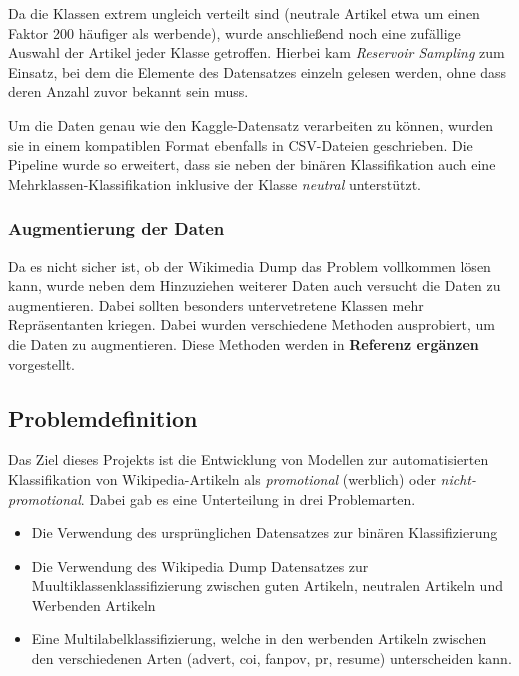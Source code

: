 Da die Klassen extrem ungleich verteilt sind (neutrale Artikel etwa um einen Faktor 200 häufiger als werbende), wurde anschließend noch eine zufällige Auswahl der Artikel jeder Klasse getroffen. Hierbei kam \textit{Reservoir Sampling} \cite{Vitter1985} zum Einsatz, bei dem die Elemente des Datensatzes einzeln gelesen werden, ohne dass deren Anzahl zuvor bekannt sein muss.

Um die Daten genau wie den Kaggle-Datensatz verarbeiten zu können, wurden sie in einem kompatiblen Format ebenfalls in CSV-Dateien geschrieben. Die Pipeline wurde so erweitert, dass sie neben der binären Klassifikation auch eine Mehrklassen-Klassifikation inklusive der Klasse \emph{neutral} unterstützt.

\subsubsection{Augmentierung der Daten}
\label{dataAugmentation}
Da es nicht sicher ist, ob der Wikimedia Dump das Problem vollkommen lösen kann, wurde neben dem Hinzuziehen weiterer Daten auch versucht die Daten zu augmentieren. Dabei sollten besonders untervetretene Klassen mehr Repräsentanten kriegen. Dabei wurden verschiedene Methoden ausprobiert, um die Daten zu augmentieren. Diese Methoden werden in \textbf{Referenz ergänzen} vorgestellt.

\subsection{Problemdefinition}
\label{Problemdefinition}
Das Ziel dieses Projekts ist die Entwicklung von Modellen zur automatisierten Klassifikation von Wikipedia-Artikeln als \emph{promotional} (werblich) oder \emph{nicht-promotional}. Dabei gab es eine Unterteilung in drei Problemarten.
\begin{itemize}
    \item Die Verwendung des ursprünglichen Datensatzes zur binären Klassifizierung
    \item Die Verwendung des Wikipedia Dump Datensatzes zur Muultiklassenklassifizierung zwischen guten Artikeln, neutralen Artikeln und Werbenden Artikeln
    \item Eine Multilabelklassifizierung, welche in den werbenden Artikeln zwischen den verschiedenen Arten (advert, coi, fanpov, pr, resume) unterscheiden kann.
\end{itemize}

